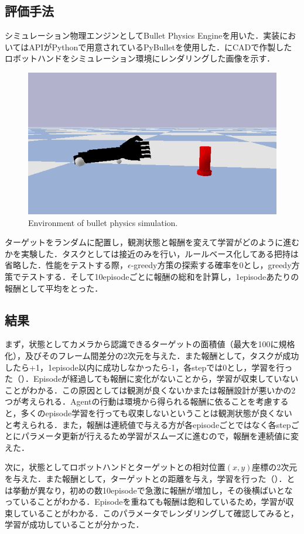 \subsection{評価手法}
シミュレーション物理エンジンとしてBullet Physics Engineを用いた．実装においてはAPIがPythonで用意されているPyBullet\cite{pybullet}を使用した．にCADで作製したロボットハンドをシミュレーション環境にレンダリングした画像を示す．

\begin{figure}[H]
    \centering
    \includegraphics[width=0.7\linewidth]{figure/chapter3/bullet_demo}
    \caption{Environment of bullet physics simulation.}
    \label{fig:1号機simu}
\end{figure}

ターゲットをランダムに配置し，観測状態と報酬を変えて学習がどのように進むかを実験した．タスクとしては接近のみを行い，ルールベース化してある把持は省略した．性能をテストする際，$\epsilon$-greedy方策の探索する確率を0とし，greedy方策でテストする．そして10episodeごとに報酬の総和を計算し，1episodeあたりの報酬として平均をとった．


\subsection{結果}
まず，状態としてカメラから認識できるターゲットの面積値（最大を100に規格化），及びそのフレーム間差分の2次元を与えた．また報酬として，タスクが成功したら+1，1episode以内に成功しなかったら-1，各stepでは0とし，学習を行った（）．Episodeが経過しても報酬に変化がないことから，学習が収束していないことがわかる．この原因としては観測が良くないかまたは報酬設計が悪いかの2つが考えられる．Agentの行動は環境から得られる報酬に依ることを考慮すると，多くのepisode学習を行っても収束しないということは観測状態が良くないと考えられる．また，報酬は連続値で与える方が各episodeごとではなく各stepごとにパラメータ更新が行えるため学習がスムーズに進むので，報酬を連続値に変えた．

次に，状態としてロボットハンドとターゲットとの相対位置$(x,y)$座標の2次元を与えた．また報酬として，ターゲットとの距離を与え，学習を行った（）．とは挙動が異なり，初めの数10episodeで急激に報酬が増加し，その後横ばいとなっていることがわかる．Episodeを重ねても報酬は飽和しているため，学習が収束していることがわかる．このパラメータでレンダリングして確認してみると，学習が成功していることが分かった．

